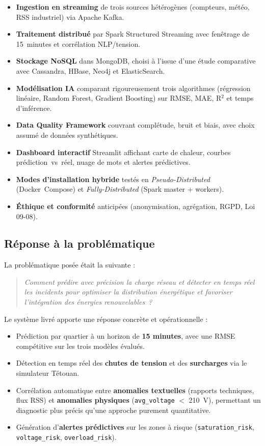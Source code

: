 \documentclass[11pt,a4paper]{article}
\newcommand{\done}{\textcolor{sectiongreen}{\ding{51}}}
\begin{document}
\begin{itemize}[leftmargin=*]
  \item[\done] \textbf{Ingestion en streaming} de trois sources hétérogènes (compteurs, météo, RSS industriel) via Apache Kafka.
  \item[\done] \textbf{Traitement distribué} par Spark Structured Streaming avec fenêtrage de 15~minutes et corrélation NLP/tension.
  \item[\done] \textbf{Stockage NoSQL} dans MongoDB, choisi à l'issue d'une étude comparative avec Cassandra, HBase, Neo4j et ElasticSearch.
  \item[\done] \textbf{Modélisation IA} comparant rigoureusement trois algorithmes (régression linéaire, Random Forest, Gradient Boosting) sur RMSE, MAE, R$^2$ et temps d'inférence.
  \item[\done] \textbf{Data Quality Framework} couvrant complétude, bruit et biais, avec choix assumé de données synthétiques.
  \item[\done] \textbf{Dashboard interactif} Streamlit affichant carte de chaleur, courbes prédiction~vs~réel, nuage de mots et alertes prédictives.
  \item[\done] \textbf{Modes d'installation hybride} testés en \emph{Pseudo-Distributed} (Docker~Compose) et \emph{Fully-Distributed} (Spark master + workers).
  \item[\done] \textbf{Éthique et conformité} anticipées (anonymisation, agrégation, RGPD, Loi 09-08).
\end{itemize}

\subsection{Réponse à la problématique}

La problématique posée était la suivante :
\begin{quote}
\itshape Comment prédire avec précision la charge réseau et détecter en temps réel les incidents pour optimiser la distribution énergétique et favoriser l'intégration des énergies renouvelables~?
\end{quote}

Le système livré apporte une réponse concrète et opérationnelle :
\begin{itemize}
  \item Prédiction par quartier à un horizon de \textbf{15 minutes}, avec une RMSE compétitive sur les trois modèles évalués.
  \item Détection en temps réel des \textbf{chutes de tension} et des \textbf{surcharges} via le simulateur Tétouan.
  \item Corrélation automatique entre \textbf{anomalies textuelles} (rapports techniques, flux RSS) et \textbf{anomalies physiques} (\texttt{avg\_voltage} $<$ 210~V), permettant un diagnostic plus précis qu'une approche purement quantitative.
  \item Génération d'\textbf{alertes prédictives} sur les zones à risque (\texttt{saturation\_risk}, \texttt{voltage\_risk}, \texttt{overload\_risk}).
\end{itemize}
\end{document}
